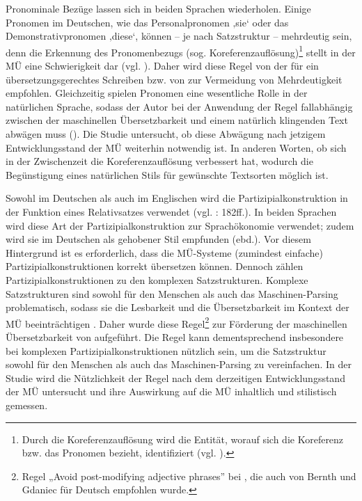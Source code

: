 Pronominale Bezüge lassen sich in beiden Sprachen wiederholen. Einige Pronomen im Deutschen, wie das Personalpronomen ‚sie‘ oder das Demonstrativpronomen ‚diese‘, können -- je nach Satzstruktur -- mehrdeutig sein, denn die Erkennung des Pronomenbezugs (sog. Koreferenzauflösung)\footnote{{{{Durch die Koreferenzauflösung wird die Entität, worauf sich die Koreferenz bzw. das Pronomen bezieht, identifiziert (vgl. \citealt{Ng2017}).}}}} stellt in der MÜ eine Schwierigkeit dar (vgl. \citealt{Ng2017}). Daher wird diese Regel von der \citet[137]{tekom2013} für ein übersetzungsgerechtes Schreiben bzw. von \citet{Congree2018} zur Vermeidung von Mehrdeutigkeit empfohlen. Gleichzeitig spielen Pronomen eine wesentliche Rolle in der natürlichen Sprache, sodass der Autor bei der Anwendung der Regel fallabhängig zwischen der maschinellen Übersetzbarkeit und einem natürlich klingenden Text abwägen muss (\citealt{BernthGdaniec2001}). Die Studie untersucht, ob diese Abwägung nach jetzigem Entwicklungsstand der MÜ weiterhin notwendig ist. In anderen Worten, ob sich in der Zwischenzeit die Koreferenzauflösung verbessert hat, wodurch die Begünstigung eines natürlichen Stils für gewünschte Textsorten möglich ist.

Sowohl im Deutschen als auch im Englischen wird die Partizipialkonstruktion in der Funktion eines Relativsatzes verwendet (vgl. \citealt{Königs2004}: 182ff.). In beiden Sprachen wird diese Art der Partizipialkonstruktion zur Sprachökonomie verwendet; zudem wird sie im Deutschen als gehobener Stil empfunden (ebd.). Vor diesem Hintergrund ist es erforderlich, dass die MÜ-Systeme (zumindest einfache) Partizipialkonstruktionen korrekt übersetzen können. Dennoch zählen Partizipialkonstruktionen zu den komplexen Satzstrukturen. Komplexe Satzstrukturen sind sowohl für den Menschen als auch das Maschinen-Parsing problematisch, sodass sie die Lesbarkeit und die Übersetzbarkeit im Kontext der MÜ beeinträchtigen \citep{Reuther2003}. Daher wurde diese Regel\footnote{{{{Regel „Avoid post-modifying adjective phrases” bei \citet{BernthGdaniec2001}, die auch von Bernth und Gdaniec für Deutsch empfohlen wurde.}}}} zur Förderung der maschinellen Übersetzbarkeit von \citet{BernthGdaniec2001} aufgeführt. Die Regel kann dementsprechend insbesondere bei komplexen Partizipialkonstruktionen nützlich sein, um die Satzstruktur sowohl für den Menschen als auch das Maschinen-Parsing zu vereinfachen. In der Studie wird die Nützlichkeit der Regel nach dem derzeitigen Entwicklungsstand der MÜ untersucht und ihre Auswirkung auf die MÜ inhaltlich und stilistisch gemessen.

